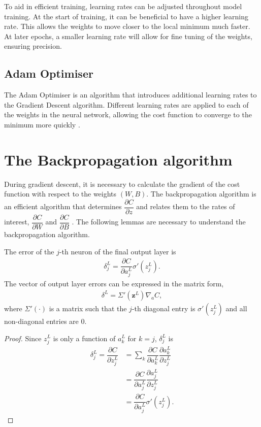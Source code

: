 To aid in efficient training, learning rates can be adjusted throughout model training. At the start of training, it can be beneficial to have a higher learning rate. This allows the weights to move closer to the local minimum much faster. At later epochs, a smaller learning rate will allow for fine tuning of the weights, ensuring precision.

\subsection*{Adam Optimiser}\label{nnets-adam}

The Adam Optimiser is an algorithm that introduces additional learning rates to the Gradient Descent algorithm. Different learning rates are applied to each of the weights in the neural network, allowing the cost function to converge to the minimum more quickly \cite{Kingma2014}.


\section{The Backpropagation algorithm}\label{nnets-backprop}

During gradient descent, it is necessary to calculate the gradient of the cost function with respect to the weights $(W,B)$. The backpropagation algorithm is an efficient algorithm that determines $\dfrac{\partial C}{\partial z}$ and relates them to the rates of interest, $\dfrac{\partial C}{\partial W}$ and $\dfrac{\partial C}{\partial B}$ \cite{Nielson2015}. The following lemmas are necessary to understand the backpropagation algorithm.


\begin{lemma}
	The error of the $j$-th neuron of the final output layer is
	\begin{align}
		\delta_j^L = \dfrac{\partial C}{\partial a_j^L}\sigma'(z_j^L).
	\end{align}
	The vector of output layer errors can be expressed in the matrix form,
	\begin{align}\label{nnets-bprop-eq1}
		\delta^L = \Sigma'(\mathbf{z}^L)\nabla_aC,
	\end{align}
where $\Sigma'(\cdot)$ is a matrix such that the $j$-th diagonal entry is $\sigma'(z_j^L)$ and all non-diagonal entries are 0.
\end{lemma}

\begin{proof}

Since $z_j^L$ is only a function of $a_k^L$ for $k = j$, $\delta_j^L$ is
	\begin{align}
		\delta_j^L = \dfrac{\partial C}{\partial z_j^L} & = \sum_k\dfrac{\partial C}{\partial a_k^L}\dfrac{\partial a_k^L}{\partial z_j^L} \\
		& = \dfrac{\partial C}{\partial a_j^L}\dfrac{\partial a_j^L}{\partial z_j^L}\\
		& = \dfrac{\partial C}{\partial a_j^L}\sigma'(z_j^L).
	\end{align}
\end{proof}

